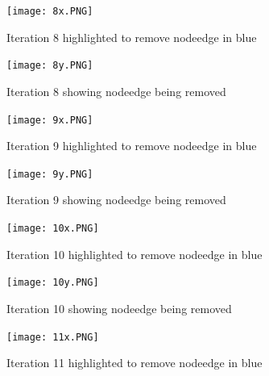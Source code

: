 \documentclass[12pt]{article}
\begin{document}
\begin{figure}[h]
    \centering
    \texttt{[image: 8x.PNG]}
    \caption{Iteration 8 highlighted to remove nodeedge in blue}
    \label{fig:web-growth}
\end{figure}

\begin{figure}[h]
    \centering
    \texttt{[image: 8y.PNG]}
    \caption{Iteration 8 showing nodeedge being removed}
    \label{fig:web-growth}
\end{figure}

\begin{figure}[h]
    \centering
    \texttt{[image: 9x.PNG]}
    \caption{Iteration 9 highlighted to remove nodeedge in blue}
    \label{fig:web-growth}
\end{figure}

\begin{figure}[h]
    \centering
    \texttt{[image: 9y.PNG]}
    \caption{Iteration 9 showing nodeedge being removed}
    \label{fig:web-growth}
\end{figure}

\begin{figure}[h]
    \centering
    \texttt{[image: 10x.PNG]}
    \caption{Iteration 10 highlighted to remove nodeedge in blue}
    \label{fig:web-growth}
\end{figure}

\begin{figure}[h]
    \centering
    \texttt{[image: 10y.PNG]}
    \caption{Iteration 10 showing nodeedge being removed}
    \label{fig:web-growth}
\end{figure}

\begin{figure}[h]
    \centering
    \texttt{[image: 11x.PNG]}
    \caption{Iteration 11 highlighted to remove nodeedge in blue}
    \label{fig:web-growth}
\end{figure}
\end{document}
